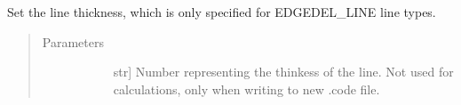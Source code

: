 \documentclass[letterpaper,10pt,english,openany,oneside]{sphinxmanual}
\begin{document}
\begin{fulllineitems}
\begin{fulllineitems}
\label{\detokenize{reference:cnc.optimization.Line.set_thickness}}
Set the line thickness, which is only specified for EDGEDEL\_LINE line
types.
\begin{quote}\begin{description}
\item[{Parameters}] \leavevmode\begin{description}
\item[{}] \leavevmode{[}str{]}
Number representing the thinkess of the line. Not used for
calculations, only when writing to new .code file.

\end{description}

\end{description}\end{quote}

\end{fulllineitems}


\end{fulllineitems}

\label{\detokenize{reference:module-cnc.visualization}}
\end{document}
